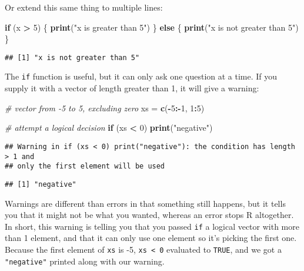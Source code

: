 \documentclass[]{book}
\newenvironment{Shaded}{\begin{snugshade}}{\end{snugshade}}
\newcommand{\KeywordTok}[1]{\textcolor[rgb]{0.13,0.29,0.53}{\textbf{#1}}}
\newcommand{\DecValTok}[1]{\textcolor[rgb]{0.00,0.00,0.81}{#1}}
\newcommand{\StringTok}[1]{\textcolor[rgb]{0.31,0.60,0.02}{#1}}
\newcommand{\CommentTok}[1]{\textcolor[rgb]{0.56,0.35,0.01}{\textit{#1}}}
\newcommand{\ControlFlowTok}[1]{\textcolor[rgb]{0.13,0.29,0.53}{\textbf{#1}}}
\newcommand{\OperatorTok}[1]{\textcolor[rgb]{0.81,0.36,0.00}{\textbf{#1}}}
\newcommand{\NormalTok}[1]{#1}
\theoremstyle{definition}
\theoremstyle{definition}
\theoremstyle{definition}
\theoremstyle{remark}
\begin{document}
Or extend this same thing to multiple lines:

\begin{Shaded}
\begin{Highlighting}[]
\ControlFlowTok{if}\NormalTok{ (x }\OperatorTok{>}\StringTok{ }\DecValTok{5}\NormalTok{) \{}
  \KeywordTok{print}\NormalTok{(}\StringTok{"x is greater than 5"}\NormalTok{)}
\NormalTok{\} }\ControlFlowTok{else}\NormalTok{ \{}
  \KeywordTok{print}\NormalTok{(}\StringTok{"x is not greater than 5"}\NormalTok{)}
\NormalTok{\} }
\end{Highlighting}
\end{Shaded}

\begin{verbatim}
## [1] "x is not greater than 5"
\end{verbatim}

The \texttt{if} function is useful, but it can only ask one question at
a time. If you supply it with a vector of length greater than 1, it will
give a warning:

\begin{Shaded}
\begin{Highlighting}[]
\CommentTok{# vector from -5 to 5, excluding zero}
\NormalTok{xs =}\StringTok{ }\KeywordTok{c}\NormalTok{(}\OperatorTok{-}\DecValTok{5}\OperatorTok{:-}\DecValTok{1}\NormalTok{, }\DecValTok{1}\OperatorTok{:}\DecValTok{5}\NormalTok{)}

\CommentTok{# attempt a logical decision}
\ControlFlowTok{if}\NormalTok{ (xs }\OperatorTok{<}\StringTok{ }\DecValTok{0}\NormalTok{) }\KeywordTok{print}\NormalTok{(}\StringTok{"negative"}\NormalTok{)}
\end{Highlighting}
\end{Shaded}

\begin{verbatim}
## Warning in if (xs < 0) print("negative"): the condition has length > 1 and
## only the first element will be used
\end{verbatim}

\begin{verbatim}
## [1] "negative"
\end{verbatim}

Warnings are different than errors in that something still happens, but
it tells you that it might not be what you wanted, whereas an error
stops R altogether. In short, this warning is telling you that you
passed \texttt{if} a logical vector with more than 1 element, and that
it can only use one element so it's picking the first one. Because the
first element of \texttt{xs} is -5, \texttt{xs\ \textless{}\ 0}
evaluated to \texttt{TRUE}, and we got a \texttt{"negative"} printed
along with our warning.
\end{document}
